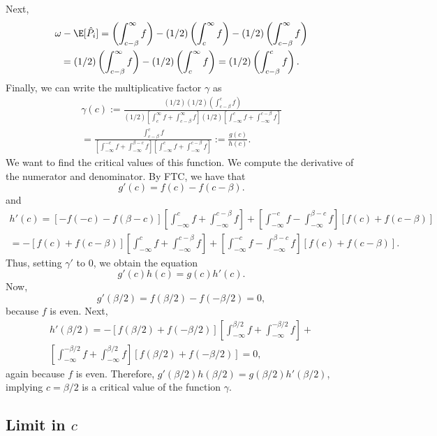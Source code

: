 \documentclass[12pt]{article}
\begin{document}
 Next,
\begin{multline*} \omega - \E[\hat{P}_i] = \left(\int_{c - \beta}^\infty f \right) - (1/2) \left( \int_{c}^\infty f \right) - (1/2) \left( \int_{c - \beta}^\infty f \right) \\ = (1/2) \left( \int_{c - \beta}^\infty f \right) - (1/2) \left( \int_{c}^\infty f \right) = (1/2) \left( \int_{c - \beta}^c f \right).\end{multline*} Finally, we can write the multiplicative factor $\gamma$ as
\begin{multline*} \gamma(c) := \frac{ (1/2)(1/2) \left(\int_{c - \beta}^c f\right) }{ (1/2) \left[\int_c^\infty f + \int_{c - \beta}^\infty f \right] (1/2) \left[\int_{-\infty}^c f + \int_{-\infty}^{c - \beta} f \right]} \\ = \frac{ \int_{c - \beta}^c f }{ \left[ \int_{-\infty}^{-c} f + \int_{-\infty}^{\beta - c} f \right] \left[ \int_{-\infty}^c f + \int_{-\infty}^{c - \beta} f \right] } := \frac{g(c)}{h(c)}.
\end{multline*} We want to find the critical values of this function. We compute the derivative of the numerator and denominator. By FTC, we have that
$$ g'(c) = f(c) - f(c - \beta).$$
and
\begin{multline*}
h'(c) = [-f(-c) - f(\beta - c)] \left[\int_{-\infty}^c f + \int_{-\infty}^{c - \beta} f \right] + \left[\int_{-\infty}^{-c} f -\int_{-\infty}^{\beta - c} f \right]\left[ f(c) + f(c - \beta) \right] \\= -[f(c) + f(c - \beta)] \left[\int_{-\infty}^c f + \int_{-\infty}^{c - \beta} f \right] + \left[\int_{-\infty}^{-c} f -\int_{-\infty}^{\beta - c} f \right]\left[ f(c) + f(c - \beta) \right].
\end{multline*} Thus, setting $\gamma'$ to $0$, we obtain the equation
$$ g'(c) h(c) = g(c) h'(c).$$
Now,
$$g'(\beta/2) = f(\beta/2) - f(-\beta/2) = 0,$$ because $f$ is even. Next, 
\begin{multline*}
h'(\beta/2) = - \left[ f(\beta/2) + f(-\beta/2) \right] \left[ \int_{-\infty}^{\beta/2} f + \int_{-\infty}^{-\beta/2} f \right] + \\ \left[\int_{-\infty}^{ -\beta/2 } f + \int_{-\infty}^{\beta/2} f \right] \left[ f(\beta/2) + f(-\beta/2) \right] = 0,
\end{multline*} again because $f$ is even. Therefore, $g'(\beta/2)h(\beta/2) = g(\beta/2)h'(\beta/2)$, implying $c = \beta/2$ is a critical value of the function $\gamma$.

\subsection{Limit in $c$}
\end{document}
